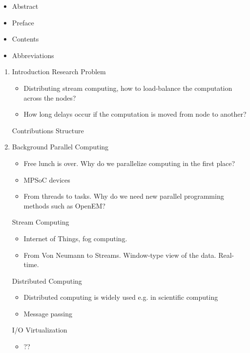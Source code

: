 \begin{itemize}
\item Abstract
\item Preface
\item Contents
\item Abbreviations
\end{itemize}

\begin{enumerate}
\item Introduction
  \subitem Research Problem
  \begin{itemize}[leftmargin=45px]
    \item Distributing stream computing, how to load-balance the computation across the nodes?
    \item How long delays occur if the computation is moved from node to another?
  \end{itemize}
  \subitem Contributions
  \subitem Structure

\item Background
  \subitem Parallel Computing
  \begin{itemize}[leftmargin=45px]
    \item Free lunch is over. Why do we parallelize computing in the first place?
    \item MPSoC devices
    \item From threads to tasks. Why do we need new parallel programming methods such as OpenEM?
  \end{itemize}
  \subitem Stream Computing
  \begin{itemize}[leftmargin=45px]
    \item Internet of Things, fog computing.
    \item From Von Neumann to Streams. Window-type view of the data. Real-time.
  \end{itemize}
  \subitem Distributed Computing
  \begin{itemize}[leftmargin=45px]
    \item Distributed computing is widely used e.g. in scientific computing
    \item Message passing
  \end{itemize}
  \subitem I/O Virtualization
  \begin{itemize}[leftmargin=45px]
    \item ??
  \end{itemize}


\end{enumerate}

